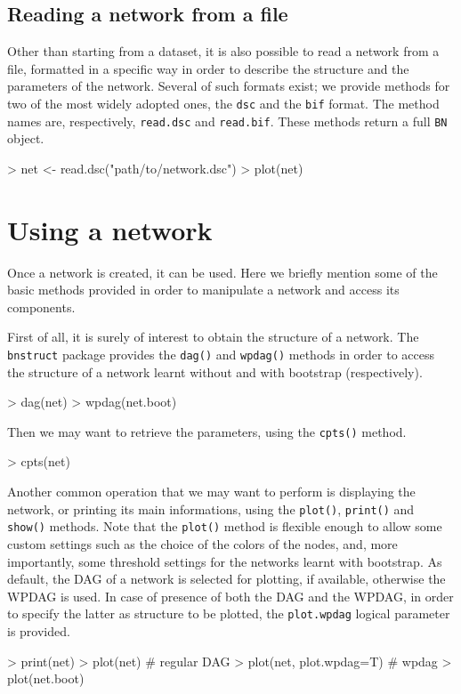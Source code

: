 \documentclass{article}
\newcommand{\Robject}[1]{{\texttt{#1}}}
\newcommand{\Rpackage}[1]{{\texttt{#1}}}
\newcommand{\Rmethod}[1]{{\texttt{#1}}}
\newcommand{\Rfunarg}[1]{{\texttt{#1}}}
\begin{document}
\subsection{Reading a network from a file}
Other than starting from a dataset, it is also possible to read a network from a file, formatted in a specific way
in order to describe the structure and the parameters of the network. Several of such formats exist; we provide methods
for two of the most widely adopted ones, the \texttt{dsc} and the \texttt{bif} format. The method names are, respectively,
\Rmethod{read.dsc} and \Rmethod{read.bif}. These methods return a full \Robject{BN} object.

\begin{Schunk}
\begin{Sinput}
> net <- read.dsc("path/to/network.dsc")
> plot(net)
\end{Sinput}
\end{Schunk}


\section{Using a network}
Once a network is created, it can be used. Here we briefly mention some of the basic methods provided in order to
manipulate a network and access its components.

First of all, it is surely of interest to obtain the structure of a network. The \Rpackage{bnstruct} package
provides the \Rmethod{dag()} and \Rmethod{wpdag()} methods in order to access the structure of a network learnt without and
with bootstrap (respectively).
\begin{Schunk}
\begin{Sinput}
> dag(net)
> wpdag(net.boot)
\end{Sinput}
\end{Schunk}

Then we may want to retrieve the parameters, using the \Rmethod{cpts()} method.
\begin{Schunk}
\begin{Sinput}
> cpts(net)
\end{Sinput}
\end{Schunk}

Another common operation that we may want to perform is displaying the network, or printing its main informations, using the
\Rmethod{plot()}, \Rmethod{print()} and \Rmethod{show()} methods. Note that the \Rmethod{plot()} method is flexible enough to allow 
some custom settings such as the choice of the colors of the nodes, and, more importantly, some threshold settings 
for the networks learnt with bootstrap. As default, the DAG of a network is selected for plotting, if available,
otherwise the WPDAG is used. In case of presence of both the DAG and the WPDAG, in order to specify the latter as
structure to be plotted, the \Rfunarg{plot.wpdag} logical parameter is provided.
\begin{Schunk}
\begin{Sinput}
> print(net)
> plot(net) # regular DAG
> plot(net, plot.wpdag=T) # wpdag
> plot(net.boot)
\end{Sinput}
\end{Schunk}
\end{document}

